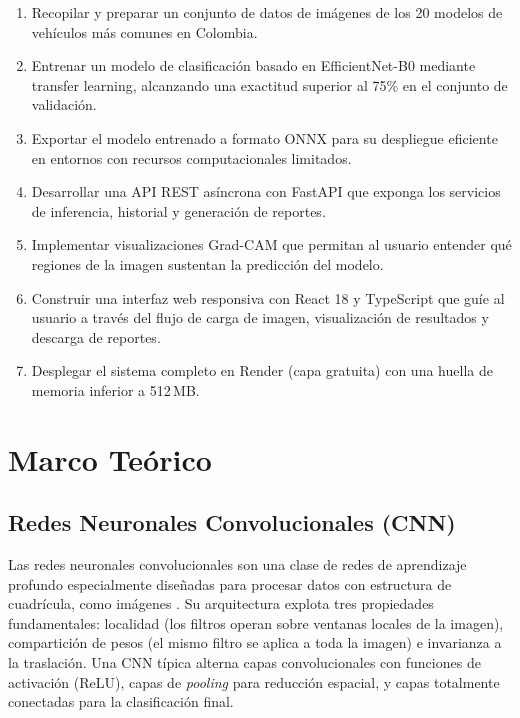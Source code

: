 \documentclass[12pt,a4paper]{article}
\begin{document}
\begin{enumerate}
    \item Recopilar y preparar un conjunto de datos de imágenes de los 20 modelos de vehículos más comunes en Colombia.
    \item Entrenar un modelo de clasificación basado en EfficientNet-B0 mediante transfer learning, alcanzando una exactitud superior al 75\% en el conjunto de validación.
    \item Exportar el modelo entrenado a formato ONNX para su despliegue eficiente en entornos con recursos computacionales limitados.
    \item Desarrollar una API REST asíncrona con FastAPI que exponga los servicios de inferencia, historial y generación de reportes.
    \item Implementar visualizaciones Grad-CAM que permitan al usuario entender qué regiones de la imagen sustentan la predicción del modelo.
    \item Construir una interfaz web responsiva con React 18 y TypeScript que guíe al usuario a través del flujo de carga de imagen, visualización de resultados y descarga de reportes.
    \item Desplegar el sistema completo en Render (capa gratuita) con una huella de memoria inferior a 512\,MB.
\end{enumerate}

\section{Marco Teórico}

\subsection{Redes Neuronales Convolucionales (CNN)}

Las redes neuronales convolucionales son una clase de redes de aprendizaje profundo especialmente diseñadas para procesar datos con estructura de cuadrícula, como imágenes \cite{lecun1998gradient}. Su arquitectura explota tres propiedades fundamentales: localidad (los filtros operan sobre ventanas locales de la imagen), compartición de pesos (el mismo filtro se aplica a toda la imagen) e invarianza a la traslación. Una CNN típica alterna capas convolucionales con funciones de activación (ReLU), capas de \textit{pooling} para reducción espacial, y capas totalmente conectadas para la clasificación final.
\end{document}
